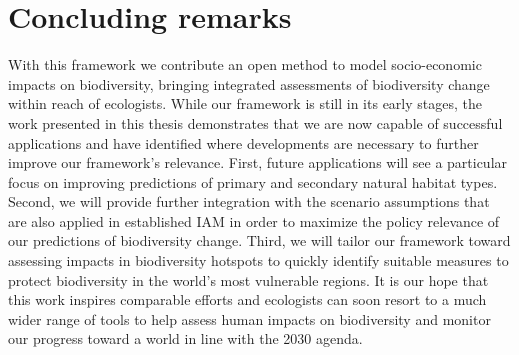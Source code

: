 \section{Concluding remarks}
With this framework we contribute an open method to model socio-economic impacts on biodiversity, bringing integrated assessments of biodiversity change within reach of ecologists. While our framework is still in its early stages, the work presented in this thesis demonstrates that we are now capable of successful applications and have identified where developments are necessary to further improve our framework's relevance. First, future applications will see a particular focus on improving predictions of primary and secondary natural habitat types. Second, we will provide further integration with the scenario assumptions that are also applied in established IAM in order to maximize the policy relevance of our predictions of biodiversity change. Third, we will tailor our framework toward assessing impacts in biodiversity hotspots to quickly identify suitable measures to protect biodiversity in the world's most vulnerable regions. It is our hope that this work inspires comparable efforts and ecologists can soon resort to a much wider range of tools to help assess human impacts on biodiversity and monitor our progress toward a world in line with the 2030 agenda.


